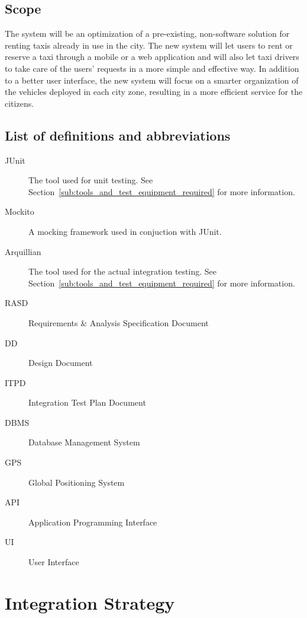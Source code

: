 \documentclass[a4paper, 12pt]{article}
\begin{document}
\subsection{Scope} %
\label{sub:scope}
The system will be an optimization of a pre-existing, non-software solution for renting taxis already in use in the city. The new system will let users to rent or reserve a taxi through a mobile or a web application and will also let taxi drivers to take care of the users' requests in a more simple and effective way. In addition to a better user interface, the new system will focus on a smarter organization of the vehicles deployed in each city zone, resulting in a more efficient service for the citizens.

\subsection{List of definitions and abbreviations}
\label{sub:list_of_definitions_and_abbreviations}

\begin{description}
    \item[JUnit] The tool used for unit testing. See Section~\ref{sub:tools_and_test_equipment_required} for more information.
    \item[Mockito] A mocking framework used in conjuction with JUnit.
    \item[Arquillian] The tool used for the actual integration testing. See Section~\ref{sub:tools_and_test_equipment_required} for more information.
    \item[RASD] Requirements \& Analysis Specification Document
    \item[DD] Design Document
    \item[ITPD] Integration Test Plan Document
    \item[DBMS] Database Management System
    \item[GPS] Global Positioning System
    \item[API] Application Programming Interface
    \item[UI] User Interface
\end{description}

\newpage
\section{Integration Strategy}
\label{sec:integration_strategy}
\end{document}
